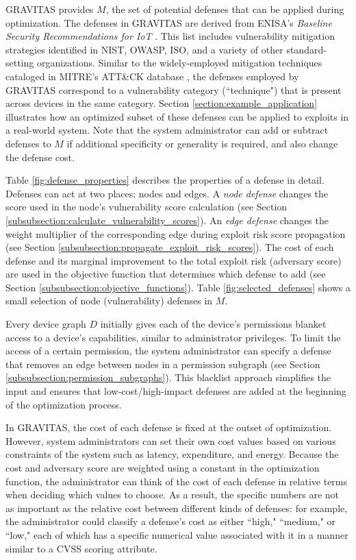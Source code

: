 \documentclass[10pt,journal,compsoc]{IEEEtran}
\begin{document}
GRAVITAS provides $M$, the set of potential defenses that can be applied during optimization. The defenses in GRAVITAS are derived from ENISA's \textit{Baseline Security Recommendations for IoT}  \cite{enisa2017}. This list includes vulnerability mitigation strategies identified in NIST, OWASP, ISO, and a variety of other standard-setting organizations. Similar to the widely-employed mitigation techniques cataloged in MITRE’s ATT\&CK database \cite{mitre2021}, the defenses employed by GRAVITAS correspond to a vulnerability category (“technique") that is present across devices in the same category. Section \ref{section:example_application} illustrates how an optimized subset of these defenses can be applied to exploits in a real-world system. Note that the system administrator can add or subtract defenses to $M$ if additional specificity or generality is required, and also change the defense cost.

Table \ref{fig:defense_properties} describes the properties of a defense in detail. Defenses can act at two places: nodes and edges. A 
\textit{node defense} changes the score used in the node’s vulnerability score calculation 
(see Section \ref{subsubsection:calculate_vulnerability_scores}). An \textit{edge defense} 
changes the weight multiplier of the corresponding edge during exploit risk score 
propagation (see Section \ref{subsubsection:propagate_exploit_risk_scores}). The cost of 
each defense and its marginal improvement to the total exploit risk (adversary score) are used in the objective function 
that determines which defense to add (see Section \ref{subsubsection:objective_functions}). Table \ref{fig:selected_defenses} shows a small selection of node (vulnerability) defenses in $M$.

	
\par Every device graph $D$ initially gives each of the device's permissions blanket access to a device's capabilities, similar to administrator privileges. To limit the access of a certain permission, the system administrator can specify a defense that removes an edge between nodes in a permission subgraph (see Section \ref{subsubsection:permission_subgraphs}). This blacklist approach simplifies the input and ensures that low-cost/high-impact defenses are added at the beginning of the optimization process.	
		
In GRAVITAS, the cost of each defense is fixed at the outset of optimization. However, system administrators can set their own cost values based on various constraints of the system such as latency, expenditure, and energy. Because the cost and adversary score are weighted using a 
constant in the optimization function, the administrator can think of the cost of each defense in 
relative terms when deciding which values to choose. As a result, the specific numbers are not as 
important as the relative cost between different kinds of defenses: for example, the administrator 
could classify a defense’s cost as either ``high," ``medium," or ``low," each of which has a specific 
numerical value associated with it in a manner similar to a CVSS scoring attribute.
\end{document}
